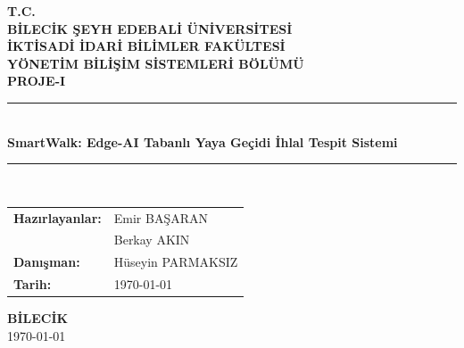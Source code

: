 \begin{titlepage}
\begin{center}

\textbf{\large T.C.}\\[0.3cm]
\textbf{\large BİLECİK ŞEYH EDEBALİ ÜNİVERSİTESİ}\\[0.3cm]
\textbf{\large İKTİSADİ İDARİ BİLİMLER FAKÜLTESİ}\\[0.3cm]
\textbf{\large YÖNETİM BİLİŞİM SİSTEMLERİ BÖLÜMÜ}\\[2cm]

\textbf{\Large PROJE-I}\\[1.5cm]

\rule{\linewidth}{0.5mm}\\[0.4cm]
{\LARGE \bfseries SmartWalk: Edge-AI Tabanlı Yaya Geçidi İhlal Tespit Sistemi}\\[0.4cm]
\rule{\linewidth}{0.5mm}\\[2cm]

\begin{tabular}{ll}
\textbf{Hazırlayanlar:} & Emir BAŞARAN \\
                        & Berkay AKIN \\[0.5cm]
\textbf{Danışman:}      & Hüseyin PARMAKSIZ \\[0.5cm]
\textbf{Tarih:}         & \today \\
\end{tabular}

\vfill

\textbf{BİLECİK} \\[0.2cm]
\today

\end{center}
\end{titlepage}
